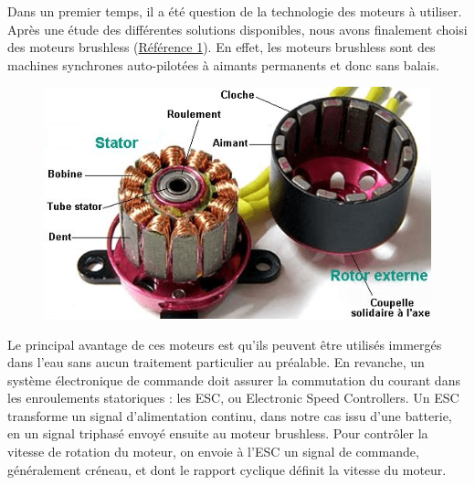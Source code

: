 \documentclass[a4paper,11pt]{report}
\begin{document}
							Dans un premier temps, il a été question de la technologie des moteurs à utiliser. Après une étude des différentes solutions disponibles, nous avons finalement choisi des moteurs brushless (\href{http://www.conrad.fr/ce/fr/product/231891/Moteur-davion-lectrique-brushless-ROXXY-315079?ref=searchDetail}{Référence 1}). En effet, les moteurs brushless sont des machines synchrones auto-pilotées à aimants permanents et donc sans balais. \newline
			\begin{figure}[!h]
				\begin{center}
					\includegraphics{Photos/moteur-brushless}
				\end{center}
			\end{figure}\newline
							Le principal avantage de ces moteurs est qu'ils peuvent être utilisés immergés dans l'eau sans aucun traitement particulier au préalable. En revanche, un système électronique de commande doit assurer la commutation du courant dans les enroulements statoriques : les ESC, ou Electronic Speed Controllers.
			Un ESC transforme un signal d'alimentation continu, dans notre cas issu d'une batterie, en un signal triphasé envoyé ensuite au moteur brushless. Pour contrôler la vitesse de rotation du moteur, on envoie à l'ESC un signal de commande, généralement créneau, et dont le rapport cyclique définit la vitesse du moteur. 
\end{document}
